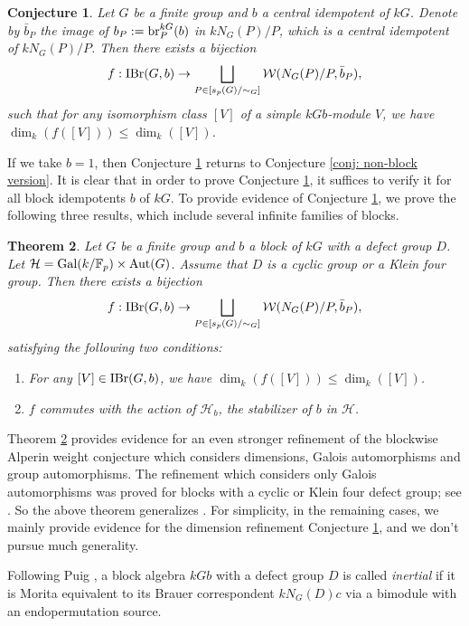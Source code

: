 \documentclass[preprint,12pt,3p]{elsarticle}
\newtheorem{theorem}{Theorem}[section]
\newtheorem{conjecture}[theorem]{Conjecture}
\def\IBr{{\rm IBr}}
\def\br{{\rm br}}
\def\Aut{{\rm Aut}}
\def\Gal{{\rm Gal}}
\def\W{\mathcal{W}}
\def\H{\mathcal{H}}
\def\F{\mathbb{F}}
\begin{document}
\begin{conjecture}\label{conj:block version}
Let $G$ be a finite group and $b$ a central idempotent of $kG$. Denote by $\bar{b}_P$ the image of $b_P:=\br_P^{kG}(b)$ in $kN_G(P)/P$, which is a central idempotent of $kN_G(P)/P$. Then there exists a bijection
$$f:\IBr(G,b)\to\bigsqcup_{P\in [s_p(G)/\sim_G]}\W(N_G(P)/P,\bar{b}_P),$$
such that for any isomorphism class $[V]$ of a simple $kGb$-module $V$, we have $\dim_k(f([V]))\leq \dim_k([V])$. 
\end{conjecture}

If we take $b=1$, then Conjecture \ref{conj:block version} returns to Conjecture \ref{conj: non-block version}. It is clear that in order to prove Conjecture \ref{conj:block version}, it suffices to verify it for all block idempotents $b$ of $kG$. To provide evidence of Conjecture \ref{conj:block version}, we prove the following three results, which include several infinite families of blocks.

\begin{theorem}\label{theo:cyclic}
Let $G$ be a finite group and $b$ a block of $kG$ with a defect group $D$. Let $\H= \Gal(k/\F_p)\times \Aut(G)$. Assume that $D$ is a cyclic group or a Klein four group. Then there exists a bijection
$$f:\IBr(G,b)\to\bigsqcup_{P\in [s_p(G)/\sim_G]}\W(N_G(P)/P,\bar{b}_P),$$
satisfying the following two conditions:
\begin{enumerate}[{\rm (i)}]
	\item For any $[V]\in \IBr(G,b)$, we have $\dim_k(f([V]))\leq \dim_k([V])$.
	\item $f$ commutes with the action of $\H_b$, the stabilizer of $b$ in $\H$.
\end{enumerate}
\end{theorem}



Theorem \ref{theo:cyclic} provides evidence for an even stronger refinement of the blockwise Alperin weight conjecture which considers dimensions, Galois automorphisms and group automorphisms. The refinement which considers only Galois automorphisms was proved for blocks with a cyclic or Klein four defect group; see \cite[Corollary 3 (i)]{Huang2024}. So the above theorem generalizes \cite[Corollary 3 (i)]{Huang2024}. For simplicity, in the remaining cases, we mainly provide evidence for the dimension refinement Conjecture \ref{conj:block version}, and we don't pursue much generality. 

Following Puig \cite[2.16]{Puig11}, a block algebra $kGb$ with a defect group $D$ is called {\it inertial} if it is Morita equivalent to its Brauer correspondent $kN_G(D)c$ via a bimodule with an endopermutation source.
\end{document}
